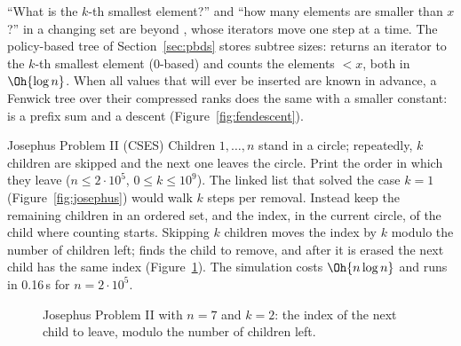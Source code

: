 ``What is the $k$-th smallest element?'' and ``how many elements are smaller than $x$?'' in a changing set are beyond
, whose iterators move one step at a time. The policy-based tree of Section~\ref{sec:pbds} stores subtree sizes:
 returns an iterator to the $k$-th smallest element (0-based) and  counts the elements
$< x$, both in $\Oh{\log n}$. When all values that will ever be inserted are known in advance, a Fenwick tree over their compressed
ranks does the same with a smaller constant:  is a prefix sum and  a descent
(Figure~\ref{fig:fendescent}).

\begin{problem}{Josephus Problem II (CSES)}
Children $1, \dots, n$ stand in a circle; repeatedly, $k$ children are skipped and the next one leaves the circle. Print the order
in which they leave ($n \le 2 \cdot 10^5$, $0 \le k \le 10^9$).
\solution The linked list that solved the case $k = 1$ (Figure~\ref{fig:josephus}) would walk $k$ steps per removal. Instead keep
the remaining children in an ordered set, and the index, in the current circle, of the child where counting starts. Skipping $k$
children moves the index by $k$ modulo the number of children left;  finds the child to remove, and after it is
erased the next child has the same index (Figure~\ref{fig:josephus2}). The simulation costs $\Oh{n \log n}$ and runs in 0.16\,s for
$n = 2 \cdot 10^5$.
\end{problem}

\begin{figure}[htbp]
\centering
{}
\caption{Josephus Problem II with $n = 7$ and $k = 2$: the index of the next child to leave, modulo the number of children left.}
\label{fig:josephus2}
\end{figure}


